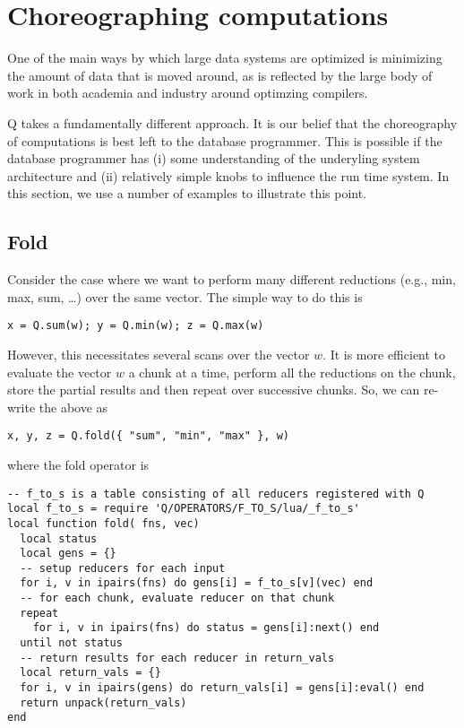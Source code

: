 \section{Choreographing computations}

One of the main ways by which large data systems are optimized is minimizing the
amount of data that is moved around, as is reflected by the large body of work in
both academia and industry around optimzing compilers. 

Q takes a fundamentally different approach. It is our belief that the
choreography of computations is best left to the database programmer. This is
possible if the database programmer has (i) some understanding of the underyling
system architecture and (ii) relatively simple knobs to influence the run time
system.  In this section, we use a number of examples to illustrate this point.


\subsection{Fold}
Consider the case where we want to perform many different reductions (e.g., min,
max, sum, \ldots) over the same vector. The simple way to do this is
\begin{verbatim}
x = Q.sum(w); y = Q.min(w); z = Q.max(w)
\end{verbatim}
However, this necessitates several scans over the vector \(w\). It is more
efficient to evaluate the vector \(w\) a chunk at a time, perform all the
reductions on the chunk, store the partial results and then repeat over
successive chunks. So, we can re-write the above as 
\begin{verbatim}
x, y, z = Q.fold({ "sum", "min", "max" }, w)
\end{verbatim}
where the fold operator is 
\begin{verbatim}
-- f_to_s is a table consisting of all reducers registered with Q
local f_to_s = require 'Q/OPERATORS/F_TO_S/lua/_f_to_s'
local function fold( fns, vec)
  local status
  local gens = {}
  -- setup reducers for each input 
  for i, v in ipairs(fns) do gens[i] = f_to_s[v](vec) end
  -- for each chunk, evaluate reducer on that chunk
  repeat 
    for i, v in ipairs(fns) do status = gens[i]:next() end 
  until not status
  -- return results for each reducer in return_vals
  local return_vals = {}
  for i, v in ipairs(gens) do return_vals[i] = gens[i]:eval() end
  return unpack(return_vals)
end
\end{verbatim}


